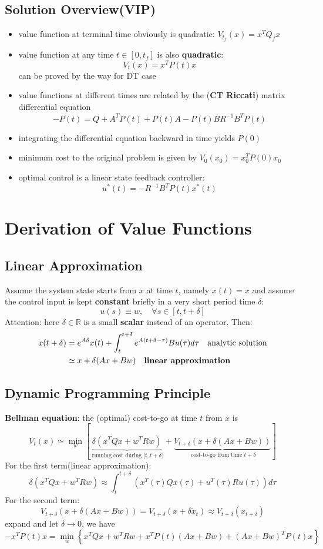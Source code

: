 \documentclass[10pt,a4paper,oneside]{article}
\begin{document}
\subsection{Solution Overview(VIP)}
\begin{itemize}
\item value function at terminal time obviously is quadratic: $V_{t_f}(x)=x^T Q_f x$
\item value function at any time $t \in [0,t_f]$ is also \textbf{quadratic}:
\[
V_t(x)=x^T P(t) x
\]
can be proved by the way for DT case
\item value functions at different times are related by the (\textbf{CT Riccati}) matrix differential equation
\[
\dot{-P(t)}=Q + A^T P(t) + P(t)A - P(t)BR^{-1}B^T P(t)
\]
\item integrating the differential equation backward in time yields $P(0)$
\item minimum cost to the original problem is given by $V_0(x_0)=x^T_0 P(0) x_0$
\item optimal control is a linear state feedback controller:
\[
u^{*}(t)=-R^{-1} B^{T} P(t) x^{*}(t)
\]
\end{itemize}

\section{Derivation of Value Functions}
\subsection{Linear Approximation}
Assume the system state starts from $x$ at time $t$, namely $x(t) = x$ and assume the control input is kept \textbf{constant} briefly in a very short period time $\delta$:
\[
u(s) \equiv w, \quad \forall s \in[t, t+\delta]
\]
Attention: here $\delta \in \mathbb{R}$ is a small \textbf{scalar} instead of an operator. Then:
\begin{align*}
x(t+\delta) &= e^{A \delta} x(t)+\int_{t}^{t+\delta} e^{A(t+\delta-\tau)} B u(\tau) d \tau \quad \text{analytic solution}\\ 
&\simeq x+\delta(A x+B w) \quad \text{\textbf{linear approximation}}
\end{align*}

\subsection{Dynamic Programming Principle}
\textbf{Bellman equation}: the (optimal) cost-to-go at time $t$ from $x$ is
\[
V_{t}(x) \simeq \min _{w}\left[\underbrace{\delta\left(x^{T} Q x+w^{T} R w\right)}_{\text { running cost during }[t, t+\delta)}+\underbrace{V_{t+\delta}(x+\delta(A x+B w))}_{\text { cost-to-go from time } t+\delta}\right]
\]
For the first term(linear approximation):
\[
\delta\left(x^{T} Q x+w^{T} R w\right) \approx \int_{t}^{t+ \delta} \left(x^{T} (\tau) Q x(\tau)+u^{T}(\tau) R u(\tau)\right) d \tau
\]
For the second term:
\[
V_{t+\delta}(x+\delta(A x+B w)) = V_{t+\delta}(x+\delta \dot{x}_t) \approx V_{t+\delta}(x_{t+\delta})
\]
expand and let $\delta \rightarrow 0$, we have
\[
-x^{T} \dot{P}(t) x=\min _{w}\left\{x^{T} Q x+w^{T} R w+x^{T} P(t)(A x+B w)+(A x+B w)^{T} P(t) x\right\}
\]
\end{document}
